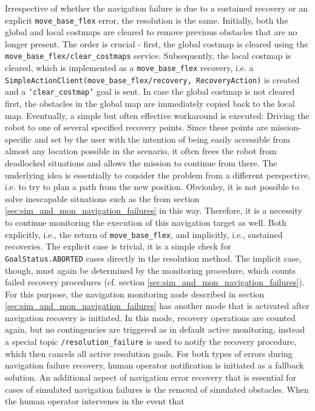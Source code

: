 \documentclass[english, master, utf8]{base/thesis_KBS}
\newcommand{\code}[1]{\colorbox{light-gray}{\texttt{#1}}}
\begin{document}
Irrespective of whether the navigation failure is due to a sustained recovery or an explicit \code{move\_base\_flex} error, the resolution is the same. Initially, both the global
and local costmaps are cleared to remove previous obstacles that are no longer present.
The order is crucial - first, the global costmap is cleared using the \code{move\_base\_flex/clear\_costmaps} service. Subsequently, the local costmap
is cleared, which is implemented as a \code{move\_base\_flex} recovery, i.e. a \code{SimpleActionClient(move\_base\_flex/recovery, RecoveryAction)} is created and a \code{`clear\_costmap'} goal is sent.
In case the global costmap is not cleared first, the obstacles in the global map are immediately copied back to the local map. Eventually, a simple but often effective workaround is
executed: Driving the robot to one of several specified recovery points. Since these points are mission-specific and set by the user with the intention of being easily accessible from
almost any location possible in the scenario, it often frees the robot from deadlocked situations and allows the mission to continue from there. The underlying idea is essentially to
consider the problem from a different perspective, i.e. to try to plan a path from the new position. Obvioulsy, it is not possible to solve inescapable
situations such as the  from section \ref{sec:sim_and_mon_navigation_failures} in this way. Therefore, it is a necessity to continue monitoring the execution
of this navigation target as well. Both explicitly, i.e., the return of \code{move\_base\_flex}, and implicitly, i.e., sustained recoveries. The explicit case is trivial, it is a
simple check for \code{GoalStatus.ABORTED} cases directly in the resolution method. The implicit case, though, must again be determined by the monitoring procedure, which counts
failed recovery procedures (cf. section \ref{sec:sim_and_mon_navigation_failures}). For this purpose, the navigation monitoring node described in section
\ref{sec:sim_and_mon_navigation_failures} has another mode that is activated after navigation recovery is initiated. In this mode, recovery operations are counted again, but no
contingencies are triggered as in default active monitoring, instead a special topic \code{/resolution\_failure} is used to notify the recovery procedure, which then cancels all
active resolution goals. For both types of errors during navigation failure recovery, human operator notification is initiated as a fallback solution. An additional aspect of
navigation error recovery that is essential for cases of simulated navigation failures is the removal of simulated obstacles. When the human operator intervenes in the event that
\end{document}

